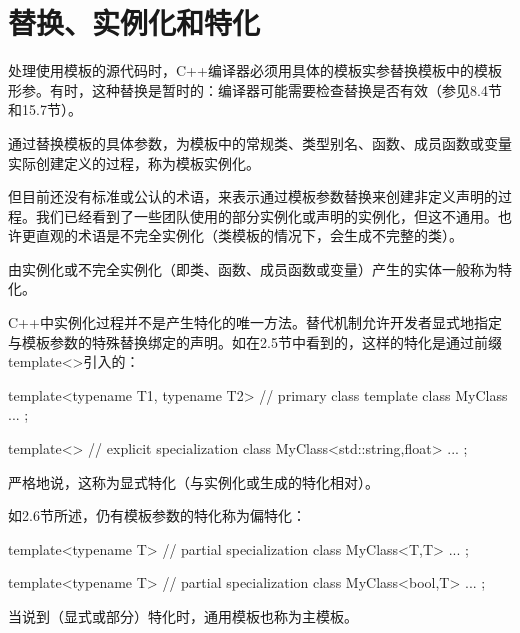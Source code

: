 \section{替换、实例化和特化}
处理使用模板的源代码时，C++编译器必须用具体的模板实参替换模板中的模板形参。有时，这种替换是暂时的：编译器可能需要检查替换是否有效（参见8.4节和15.7节）。

通过替换模板的具体参数，为模板中的常规类、类型别名、函数、成员函数或变量实际创建定义的过程，称为模板实例化。

但目前还没有标准或公认的术语，来表示通过模板参数替换来创建非定义声明的过程。我们已经看到了一些团队使用的部分实例化或声明的实例化，但这不通用。也许更直观的术语是不完全实例化（类模板的情况下，会生成不完整的类）。

由实例化或不完全实例化（即类、函数、成员函数或变量）产生的实体一般称为特化。

C++中实例化过程并不是产生特化的唯一方法。替代机制允许开发者显式地指定与模板参数的特殊替换绑定的声明。如在2.5节中看到的，这样的特化是通过前缀template<>引入的：

\begin{cpp}
template<typename T1, typename T2> // primary class template
class MyClass {
  ...
};

template<> // explicit specialization
class MyClass<std::string,float> {
  ...
};
\end{cpp}

严格地说，这称为显式特化（与实例化或生成的特化相对）。

如2.6节所述，仍有模板参数的特化称为偏特化：

\begin{cpp}
template<typename T> // partial specialization
class MyClass<T,T> {
  ...
};

template<typename T> // partial specialization
class MyClass<bool,T> {
  ...
};
\end{cpp}

当说到（显式或部分）特化时，通用模板也称为主模板。
